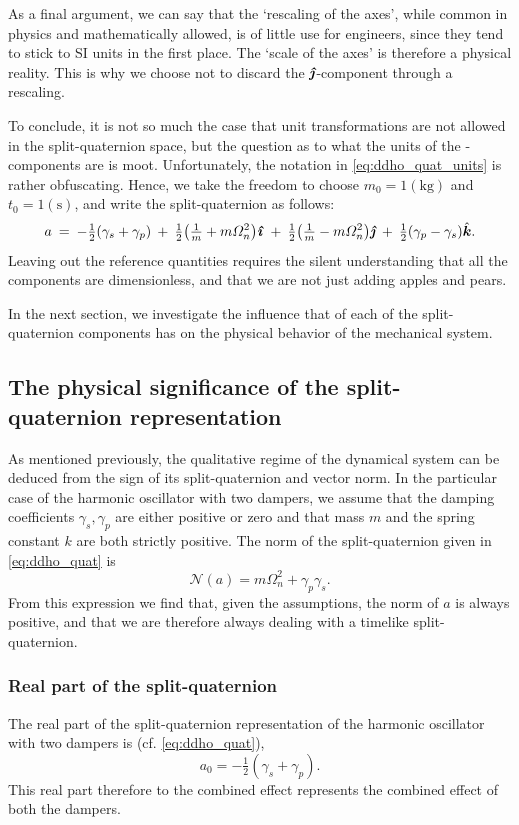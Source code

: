 As a final argument, we can say that the `rescaling of the axes', while common in physics and mathematically allowed, is of little use for engineers, since they tend to stick to SI units in the first place. The `scale of the axes' is therefore a physical reality. This is why we choose not to discard the $\quatj$-component through a rescaling.

To conclude, it is not so much the case that unit transformations are not allowed in the split-quaternion space, but the question as to what the units of the \quatj-components are is moot. Unfortunately, the notation in \cref{eq:ddho_quat_units} is rather obfuscating. Hence, we take the freedom to choose $m_0 = 1 (\si{\kilogram})$ and $t_0 = 1 (\si{\second})$, and write the split-quaternion as follows:
\begin{equation}
    a\:=\: -\tfrac{1}{2}\qty(\gamma_s + \gamma_p)\:+\:\tfrac{1}{2}\qty(\tfrac{1}{m} + m\Omega_n^2)\quati\:+\:\tfrac{1}{2}\qty(\tfrac{1}{m} - m\Omega_n^2)\quatj\:+\:\tfrac{1}{2}\qty(\gamma_p - \gamma_s)\quatk. 
    \label{eq:ddho_quat}
\end{equation}
Leaving out the reference quantities requires the silent understanding that all the components are dimensionless, and that we are not just adding apples and pears. 

In the next section, we investigate the influence that of each of the split-quaternion components has on the physical behavior of the mechanical system.

\subsection{The physical significance of the split-quaternion representation}
As mentioned previously, the qualitative regime of the dynamical system can be deduced from the sign of its split-quaternion and vector norm. In the particular case of the harmonic oscillator with two dampers, we assume that the damping coefficients $\gamma_s, \gamma_p$ are either positive or zero and that mass $m$ and the spring constant $k$ are both strictly positive. The norm of the split-quaternion given in \cref{eq:ddho_quat} is
$$ \mathscr{N}(a) = m \Omega_n^2 + \gamma_p \gamma_s.$$
From this expression we find that, given the assumptions, the norm of $a$ is always positive, and that we are therefore always dealing with a timelike split-quaternion. 

\subsubsection{Real part of the split-quaternion} 
The real part of the split-quaternion representation of the harmonic oscillator with two dampers is (cf. \cref{eq:ddho_quat}),
$$ a_0 = -\tfrac{1}{2}(\gamma_s + \gamma_p). $$
This real part therefore to the combined effect represents the combined effect of both the dampers.


